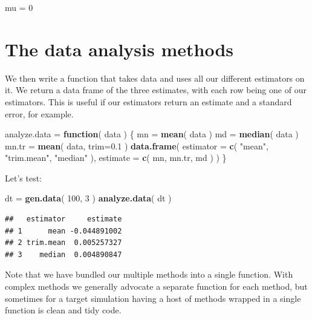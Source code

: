 \documentclass[
]{book}
\newenvironment{Shaded}{\begin{snugshade}}{\end{snugshade}}
\newcommand{\AttributeTok}[1]{\textcolor[rgb]{0.13,0.29,0.53}{#1}}
\newcommand{\ControlFlowTok}[1]{\textcolor[rgb]{0.13,0.29,0.53}{\textbf{#1}}}
\newcommand{\DecValTok}[1]{\textcolor[rgb]{0.00,0.00,0.81}{#1}}
\newcommand{\FloatTok}[1]{\textcolor[rgb]{0.00,0.00,0.81}{#1}}
\newcommand{\FunctionTok}[1]{\textcolor[rgb]{0.13,0.29,0.53}{\textbf{#1}}}
\newcommand{\NormalTok}[1]{#1}
\newcommand{\OtherTok}[1]{\textcolor[rgb]{0.56,0.35,0.01}{#1}}
\newcommand{\StringTok}[1]{\textcolor[rgb]{0.31,0.60,0.02}{#1}}
\begin{document}
\begin{Shaded}
\begin{Highlighting}[]
\NormalTok{mu }\OtherTok{=} \DecValTok{0}
\end{Highlighting}
\end{Shaded}

\section{The data analysis methods}\label{the-data-analysis-methods}

We then write a function that takes data and uses all our different
estimators on it. We return a data frame of the three estimates, with each
row being one of our estimators. This is useful if our estimators return an
estimate and a standard error, for example.

\begin{Shaded}
\begin{Highlighting}[]
\NormalTok{analyze.data }\OtherTok{=} \ControlFlowTok{function}\NormalTok{( data ) \{}
\NormalTok{    mn }\OtherTok{=} \FunctionTok{mean}\NormalTok{( data )}
\NormalTok{    md }\OtherTok{=} \FunctionTok{median}\NormalTok{( data )}
\NormalTok{    mn.tr }\OtherTok{=} \FunctionTok{mean}\NormalTok{( data, }\AttributeTok{trim=}\FloatTok{0.1}\NormalTok{ )}
    \FunctionTok{data.frame}\NormalTok{( }\AttributeTok{estimator =} \FunctionTok{c}\NormalTok{( }\StringTok{"mean"}\NormalTok{, }\StringTok{"trim.mean"}\NormalTok{, }\StringTok{"median"}\NormalTok{ ),}
                \AttributeTok{estimate =} \FunctionTok{c}\NormalTok{( mn, mn.tr, md ) )}
\NormalTok{\}}
\end{Highlighting}
\end{Shaded}

Let's test:

\begin{Shaded}
\begin{Highlighting}[]
\NormalTok{dt }\OtherTok{=} \FunctionTok{gen.data}\NormalTok{( }\DecValTok{100}\NormalTok{, }\DecValTok{3}\NormalTok{ )}
\FunctionTok{analyze.data}\NormalTok{( dt )}
\end{Highlighting}
\end{Shaded}

\begin{verbatim}
##   estimator     estimate
## 1      mean -0.044891002
## 2 trim.mean  0.005257327
## 3    median  0.004890847
\end{verbatim}

Note that we have bundled our multiple methods into a single function.
With complex methods we generally advocate a separate function for each method, but sometimes for a target simulation having a host of methods wrapped in a single function is clean and tidy code.
\end{document}
